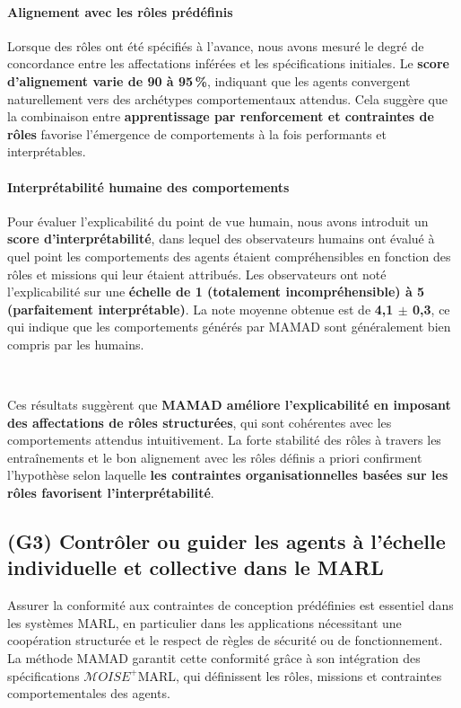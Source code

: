 \documentclass[pdflatex,sn-mathphys-num]{sn-jnl}%
\theoremstyle{thmstyleone}%
\theoremstyle{thmstyletwo}%
\theoremstyle{thmstylethree}%
\begin{document}
\paragraph{Alignement avec les rôles prédéfinis}
Lorsque des rôles ont été spécifiés à l'avance, nous avons mesuré le degré de concordance entre les affectations inférées et les spécifications initiales. Le \textbf{score d'alignement varie de 90 à 95\,\%}, indiquant que les agents convergent naturellement vers des archétypes comportementaux attendus. Cela suggère que la combinaison entre \textbf{apprentissage par renforcement et contraintes de rôles} favorise l'émergence de comportements à la fois performants et interprétables.
\paragraph{Interprétabilité humaine des comportements}
Pour évaluer l'explicabilité du point de vue humain, nous avons introduit un \textbf{score d'interprétabilité}, dans lequel des observateurs humains ont évalué à quel point les comportements des agents étaient compréhensibles en fonction des rôles et missions qui leur étaient attribués. Les observateurs ont noté l'explicabilité sur une \textbf{échelle de 1 (totalement incompréhensible) à 5 (parfaitement interprétable)}. La note moyenne obtenue est de \textbf{4{,}1 $\pm$ 0{,}3}, ce qui indique que les comportements générés par MAMAD sont généralement bien compris par les humains.

\

Ces résultats suggèrent que \textbf{MAMAD améliore l'explicabilité en imposant des affectations de rôles structurées}, qui sont cohérentes avec les comportements attendus intuitivement. La forte stabilité des rôles à travers les entraînements et le bon alignement avec les rôles définis a priori confirment l'hypothèse selon laquelle \textbf{les contraintes organisationnelles basées sur les rôles favorisent l'interprétabilité}.


\subsection{(G3) Contrôler ou guider les agents à l'échelle individuelle et collective dans le MARL}

Assurer la conformité aux contraintes de conception prédéfinies est essentiel dans les systèmes MARL, en particulier dans les applications nécessitant une coopération structurée et le respect de règles de sécurité ou de fonctionnement. La méthode MAMAD garantit cette conformité grâce à son intégration des spécifications $\mathcal{M}OISE^+$MARL, qui définissent les rôles, missions et contraintes comportementales des agents.
\end{document}
